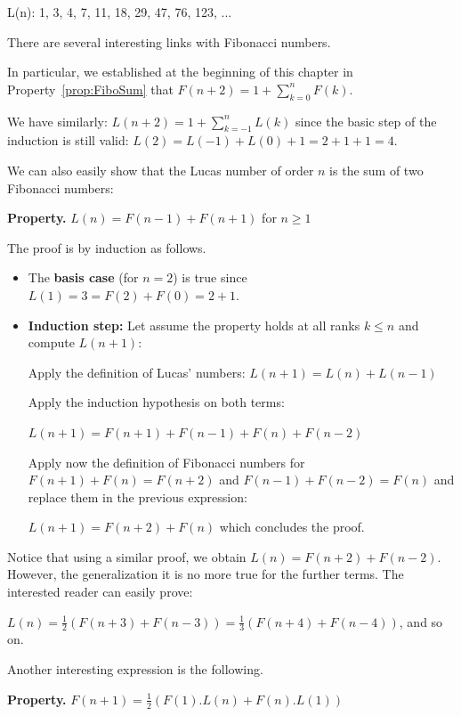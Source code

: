 L(n): 1, 3, 4, 7, 11, 18, 29, 47, 76, 123, ...
\bigskip

There are several interesting links with Fibonacci numbers.

In particular, we established at the beginning of this chapter in Property~\ref{prop:FiboSum} that
$F(n+2) = 1+ \sum_{k=0}^{n} F(k)$. 

We have similarly: $L(n+2) = 1+ \sum_{k=-1}^{n} L(k)$ since the basic step of the induction is still valid: $L(2) = L(-1 )+L(0) +1 = 2+1+1 = 4$.
\bigskip

We can also easily show that the Lucas number of order $n$ is the sum of two Fibonacci numbers:

\noindent \textbf{Property. } 
\label{prop:Lucas1}
$L(n) = F(n-1)+F(n+1)$ for $n \geq 1$
\medskip


The proof is by induction as follows.

\begin{itemize}
\item
The \textbf{basis case} (for $n=2$) is true since $L(1) = 3 = F(2) + F(0) = 2+1$.

\item
\textbf{Induction step:} Let assume the property holds at all ranks $k \leq n$ and compute $L(n+1)$:

Apply the definition of Lucas' numbers: $L(n+1) = L(n)+L(n-1)$

Apply the induction hypothesis on both terms:

 $L(n+1) = F(n+1)+F(n-1)+F(n)+F(n-2)$
 
Apply now the definition of Fibonacci numbers for $F(n+1) + F(n) = F(n+2)$  and $F(n-1) + F(n-2) = F(n)$
and replace them in the previous expression:

$L(n+1) = F(n+2)+F(n)$
which concludes the proof.

%
\end{itemize}
\medskip

Notice that using a similar proof, we obtain $L(n) = F(n+2)+F(n-2)$. 
However, the generalization it is no more true for the further terms.
The interested reader can easily prove:

$L(n) = \frac{1}{2} (F(n+3)+F(n-3))= \frac{1}{3} (F(n+4)+F(n-4))$, and so on.
\medskip

Another interesting expression is the following.

\noindent \textbf{Property. } 
\label{prop:Lucas2}
$F(n+1) = \frac{1}{2} (F(1).L(n) + F(n).L(1))$



